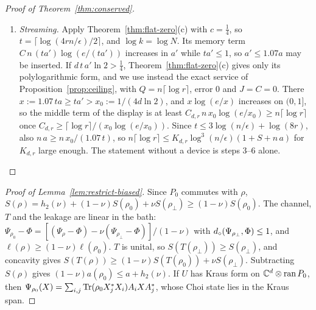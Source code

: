 \begin{proof}[Proof of Theorem~\ref{thm:conserved}]
\begin{enumerate}[label=\arabic*.,itemsep=1pt]
$a'=\sum_{\Sigma'}\hat w_sa_s\le\frac{1+\eta}{1-\delta}\sum_sw_sa_s=\frac{33}{31}a<1.07\,a$.
\item \emph{Streaming.} Apply Theorem~\ref{thm:flat-zero}(c) with $c=\frac14$, so $t=\lceil\log(4rn/\epsilon)/2\rceil$, and $\log k=\log N$. Its memory term
$C\,n\,(ta')\log(e/(ta'))$ increases in $a'$ while $ta'\le1$, so $a'\le1.07a$ may be inserted. If $d\,t\,a'\ln2>\frac14$, Theorem~\ref{thm:flat-zero}(c)
gives only its polylogarithmic form, and we use instead the exact service of Proposition~\ref{prop:ceiling}, with $Q=n\lceil\log r\rceil$, error $0$ and
$J=C=0$. There $x:=1.07\,ta\ge ta'>x_0:=1/(4d\ln2)$, and $x\log(e/x)$ increases on $(0,1]$, so the middle term of the display is at least
$C_{d,r}\,n\,x_0\log(e/x_0)\ge n\lceil\log r\rceil$ once $C_{d,r}\ge\lceil\log r\rceil/(x_0\log(e/x_0))$. Since $t\le3\log(n/\epsilon)+\log(8r)$, also
$n\,a\ge n\,x_0/(1.07\,t)$, so $n\lceil\log r\rceil\le K_{d,r}\log^3(n/\epsilon)(1+S+n\,a)$ for $K_{d,r}$ large enough. The statement without a device is steps 3--6 alone.\qedhere
\end{enumerate}
\end{proof}

\begin{proof}[Proof of Lemma~\ref{lem:restrict-biased}]
Since $P_0$ commutes with $\rho$, $S(\rho)=h_2(\nu)+(1-\nu)S(\rho_0)+\nu S(\rho_\perp)\ge(1-\nu)S(\rho_0)$. The channel, $T$ and the leakage are linear in the bath:
$\Psi_{\rho_0}-\Phi=[(\Psi_\rho-\Phi)-\nu(\Psi_{\rho_\perp}-\Phi)]/(1-\nu)$ with $d_\diamond(\Psi_{\rho_\perp},\Phi)\le1$, and $\ell(\rho)\ge(1-\nu)\ell(\rho_0)$. $T$ is unital, so
$S(T(\rho_\perp))\ge S(\rho_\perp)$, and concavity gives $S(T(\rho))\ge(1-\nu)S(T(\rho_0))+\nu S(\rho_\perp)$. Subtracting $S(\rho)$ gives $(1-\nu)a(\rho_0)\le a+h_2(\nu)$. If $U$
has Kraus form on $\mathbb C^d\otimes\operatorname{ran}P_0$, then $\Psi_{\rho_0}(X)=\sum_{i,j}\operatorname{Tr}(\rho_0X_j^*X_i)A_iXA_j^*$, whose Choi state lies in the Kraus span.
\end{proof}

